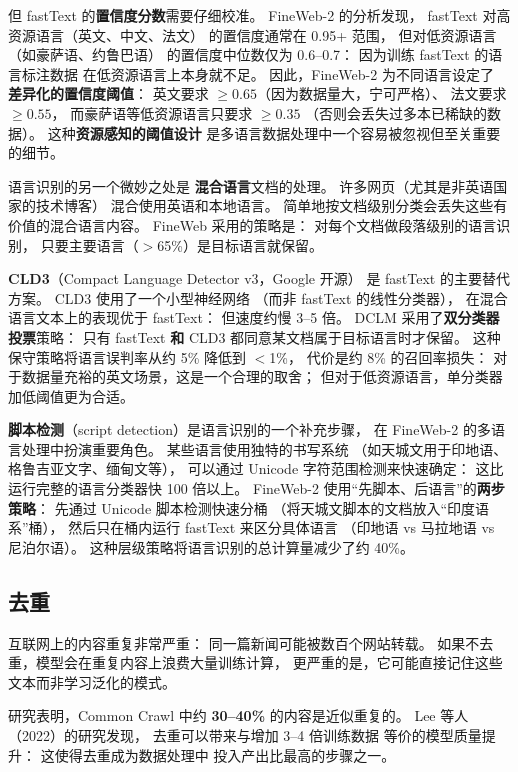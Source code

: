 但 fastText 的\textbf{置信度分数}需要仔细校准。
FineWeb-2 的分析发现，
fastText 对高资源语言（英文、中文、法文）
的置信度通常在 0.95+ 范围，
但对低资源语言（如豪萨语、约鲁巴语）
的置信度中位数仅为 0.6--0.7：
因为训练 fastText 的语言标注数据
在低资源语言上本身就不足。
因此，FineWeb-2 为不同语言设定了
\textbf{差异化的置信度阈值}：
英文要求 $\geq 0.65$（因为数据量大，宁可严格）、
法文要求 $\geq 0.55$，
而豪萨语等低资源语言只要求 $\geq 0.35$
（否则会丢失过多本已稀缺的数据）。
这种\textbf{资源感知的阈值设计}
是多语言数据处理中一个容易被忽视但至关重要的细节。

语言识别的另一个微妙之处是
\textbf{混合语言}文档的处理。
许多网页（尤其是非英语国家的技术博客）
混合使用英语和本地语言。
简单地按文档级别分类会丢失这些有价值的混合语言内容。
FineWeb 采用的策略是：
对每个文档做段落级别的语言识别，
只要主要语言（$>$65\%）是目标语言就保留。

\textbf{CLD3}（Compact Language Detector v3，Google 开源）
是 fastText 的主要替代方案。
CLD3 使用了一个小型神经网络
（而非 fastText 的线性分类器），
在混合语言文本上的表现优于 fastText：
但速度约慢 3--5 倍。
DCLM 采用了\textbf{双分类器投票}策略：
只有 fastText \textbf{和} CLD3 都同意某文档属于目标语言时才保留。
这种保守策略将语言误判率从约 5\% 降低到 $<$1\%，
代价是约 8\% 的召回率损失：
对于数据量充裕的英文场景，这是一个合理的取舍；
但对于低资源语言，单分类器加低阈值更为合适。

\textbf{脚本检测}（script detection）是语言识别的一个补充步骤，
在 FineWeb-2 的多语言处理中扮演重要角色。
某些语言使用独特的书写系统
（如天城文用于印地语、格鲁吉亚文字、缅甸文等），
可以通过 Unicode 字符范围检测来快速确定：
这比运行完整的语言分类器快 100 倍以上。
FineWeb-2 使用“先脚本、后语言”的\textbf{两步策略}：
先通过 Unicode 脚本检测快速分桶
（将天城文脚本的文档放入“印度语系”桶），
然后只在桶内运行 fastText 来区分具体语言
（印地语 vs 马拉地语 vs 尼泊尔语）。
这种层级策略将语言识别的总计算量减少了约 40\%。

\subsection{去重}

互联网上的内容重复非常严重：
同一篇新闻可能被数百个网站转载。
如果不去重，模型会在重复内容上浪费大量训练计算，
更严重的是，它可能直接记住这些文本而非学习泛化的模式。

研究表明，Common Crawl 中约 \textbf{30--40\%}
的内容是近似重复的。
Lee 等人（2022）的研究发现，
去重可以带来与增加 3--4 倍训练数据
等价的模型质量提升：
这使得去重成为数据处理中
投入产出比最高的步骤之一。

